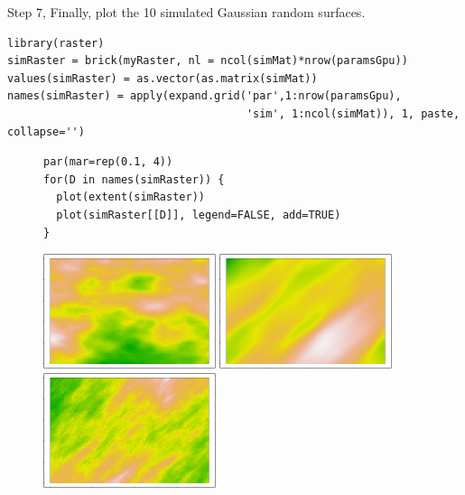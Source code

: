 \documentclass[article,nojss]{jss}\usepackage[]{graphicx}\usepackage[]{color}
\makeatletter
\newenvironment{kframe}{%
 \def\at@end@of@kframe{}%
 \ifinner\ifhmode%
  \def\at@end@of@kframe{\end{minipage}}%
  \begin{minipage}{\columnwidth}%
 \fi\fi%
 \def\FrameCommand##1{\hskip\@totalleftmargin \hskip-\fboxsep
 \colorbox{shadecolor}{##1}\hskip-\fboxsep
     \hskip-\linewidth \hskip-\@totalleftmargin \hskip\columnwidth}%
 \MakeFramed {\advance\hsize-\width
   \@totalleftmargin\z@ \linewidth\hsize
   \@setminipage}}%
 {\par\unskip\endMakeFramed%
 \at@end@of@kframe}
\newenvironment{knitrout}{}{} %
\makeatother
\begin{document}
Step 7, Finally, plot the 10 simulated Gaussian random surfaces.
\begin{knitrout}
\color{fgcolor}\begin{kframe}
\begin{verbatim}
library(raster)
simRaster = brick(myRaster, nl = ncol(simMat)*nrow(paramsGpu))
values(simRaster) = as.vector(as.matrix(simMat))
names(simRaster) = apply(expand.grid('par',1:nrow(paramsGpu), 
                                     'sim', 1:ncol(simMat)), 1, paste, collapse='')
\end{verbatim}
\end{kframe}
\end{knitrout}
\begin{figure}[H]
\centering
\begin{knitrout}
\color{fgcolor}\begin{kframe}
\begin{verbatim}
par(mar=rep(0.1, 4))
for(D in names(simRaster)) {
  plot(extent(simRaster))
  plot(simRaster[[D]], legend=FALSE, add=TRUE)
}
\end{verbatim}
\end{kframe}
\includegraphics[width=0.45\textwidth]{figure/maternplot-1} 
\includegraphics[width=0.45\textwidth]{figure/maternplot-2} 
\includegraphics[width=0.45\textwidth]{figure/maternplot-3} 

\end{knitrout}
\end{figure}
\end{document}
